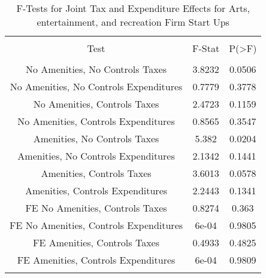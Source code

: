 
\begin{table}[!htbp] \centering 
  \caption{F-Tests for Joint Tax and Expenditure Effects for Arts, entertainment, and recreation Firm Start Ups} 
  \label{71Ftests} 
\begin{tabular}{@{\extracolsep{5pt}} ccc} 
\\[-1.8ex]\hline 
\hline \\[-1.8ex] 
Test & F-Stat & P(\textgreater F) \\ 
\hline \\[-1.8ex] 
No Amenities, No Controls Taxes & 3.8232 & 0.0506 \\ 
No Amenities, No Controls Expenditures & 0.7779 & 0.3778 \\ 
No Amenities, Controls Taxes & 2.4723 & 0.1159 \\ 
No Amenities, Controls Expenditures & 0.8565 & 0.3547 \\ 
Amenities, No Controls Taxes & 5.382 & 0.0204 \\ 
Amenities, No Controls Expenditures & 2.1342 & 0.1441 \\ 
Amenities, Controls Taxes & 3.6013 & 0.0578 \\ 
Amenities, Controls Expenditures & 2.2443 & 0.1341 \\ 
FE No Amenities, Controls Taxes & 0.8274 & 0.363 \\ 
FE No Amenities, Controls Expenditures & 6e-04 & 0.9805 \\ 
FE Amenities, Controls Taxes & 0.4933 & 0.4825 \\ 
FE Amenities, Controls Expenditures & 6e-04 & 0.9809 \\ 
\hline \\[-1.8ex] 
\end{tabular} 
\end{table} 
